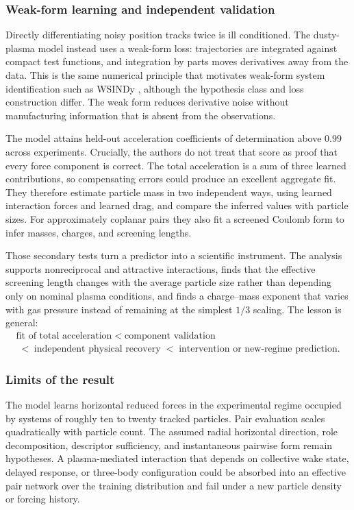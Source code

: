 \subsubsection{Weak-form learning and independent validation}

Directly differentiating noisy position tracks twice is ill conditioned. The dusty-plasma model instead uses a weak-form loss: trajectories are integrated against compact test functions, and integration by parts moves derivatives away from the data. This is the same numerical principle that motivates weak-form system identification such as WSINDy \citep{messenger2021wsindy}, although the hypothesis class and loss construction differ. The weak form reduces derivative noise without manufacturing information that is absent from the observations.

The model attains held-out acceleration coefficients of determination above \(0.99\) across experiments. Crucially, the authors do not treat that score as proof that every force component is correct. The total acceleration is a sum of three learned contributions, so compensating errors could produce an excellent aggregate fit. They therefore estimate particle mass in two independent ways, using learned interaction forces and learned drag, and compare the inferred values with particle sizes. For approximately coplanar pairs they also fit a screened Coulomb form to infer masses, charges, and screening lengths.

Those secondary tests turn a predictor into a scientific instrument. The analysis supports nonreciprocal and attractive interactions, finds that the effective screening length changes with the average particle size rather than depending only on nominal plasma conditions, and finds a charge--mass exponent that varies with gas pressure instead of remaining at the simplest \(1/3\) scaling. The lesson is general:
\[
\begin{gathered}
\text{fit of total acceleration}
\;<\;
\text{component validation}
\\[-0.15em]
\;<\;
\text{independent physical recovery}
\;<\;
\text{intervention or new-regime prediction}.
\end{gathered}
\]

\subsubsection{Limits of the result}

The model learns horizontal reduced forces in the experimental regime occupied by systems of roughly ten to twenty tracked particles. Pair evaluation scales quadratically with particle count. The assumed radial horizontal direction, role decomposition, descriptor sufficiency, and instantaneous pairwise form remain hypotheses. A plasma-mediated interaction that depends on collective wake state, delayed response, or three-body configuration could be absorbed into an effective pair network over the training distribution and fail under a new particle density or forcing history.

